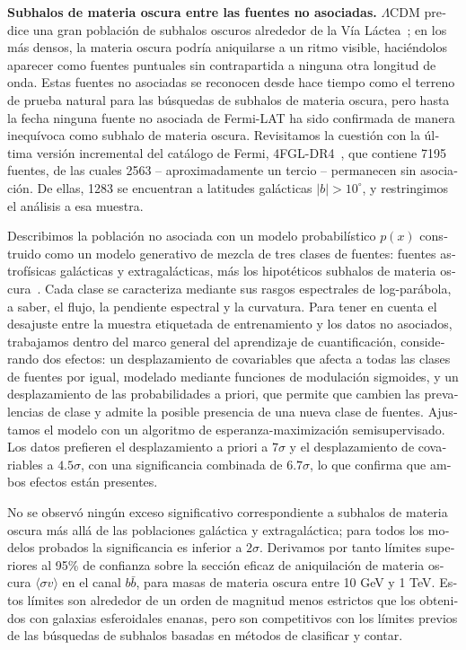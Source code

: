 \begin{otherlanguage}{spanish}
\textbf{Subhalos de materia oscura entre las fuentes no asociadas.} $\Lambda$CDM predice una gran población de subhalos oscuros alrededor de la Vía Láctea~\cite{Springel:2008cc}; en los más densos, la materia oscura podría aniquilarse a un ritmo visible, haciéndolos aparecer como fuentes puntuales sin contrapartida a ninguna otra longitud de onda. Estas fuentes no asociadas se reconocen desde hace tiempo como el terreno de prueba natural para las búsquedas de subhalos de materia oscura, pero hasta la fecha ninguna fuente no asociada de Fermi-LAT ha sido confirmada de manera inequívoca como subhalo de materia oscura. Revisitamos la cuestión con la última versión incremental del catálogo de Fermi, 4FGL-DR4~\cite{Ballet:2023qzs}, que contiene 7195 fuentes, de las cuales 2563 -- aproximadamente un tercio -- permanecen sin asociación. De ellas, 1283 se encuentran a latitudes galácticas $|b| > 10^\circ$, y restringimos el análisis a esa muestra.

Describimos la población no asociada con un modelo probabilístico $p(x)$ construido como un modelo generativo de mezcla de tres clases de fuentes: fuentes astrofísicas galácticas y extragalácticas, más los hipotéticos subhalos de materia oscura~\cite{Amerio:2025fhz}. Cada clase se caracteriza mediante sus rasgos espectrales de log-parábola, a saber, el flujo, la pendiente espectral y la curvatura. Para tener en cuenta el desajuste entre la muestra etiquetada de entrenamiento y los datos no asociados, trabajamos dentro del marco general del aprendizaje de cuantificación, considerando dos efectos: un desplazamiento de covariables que afecta a todas las clases de fuentes por igual, modelado mediante funciones de modulación sigmoides, y un desplazamiento de las probabilidades a priori, que permite que cambien las prevalencias de clase y admite la posible presencia de una nueva clase de fuentes. Ajustamos el modelo con un algoritmo de esperanza-maximización semisupervisado. Los datos prefieren el desplazamiento a priori a $7\sigma$ y el desplazamiento de covariables a $4.5\sigma$, con una significancia combinada de $6.7\sigma$, lo que confirma que ambos efectos están presentes.

No se observó ningún exceso significativo correspondiente a subhalos de materia oscura más allá de las poblaciones galáctica y extragaláctica; para todos los modelos probados la significancia es inferior a $2\sigma$. Derivamos por tanto límites superiores al 95\% de confianza sobre la sección eficaz de aniquilación de materia oscura $\langle \sigma v\rangle$ en el canal $b\bar{b}$, para masas de materia oscura entre 10 GeV y 1 TeV. Estos límites son alrededor de un orden de magnitud menos estrictos que los obtenidos con galaxias esferoidales enanas, pero son competitivos con los límites previos de las búsquedas de subhalos basadas en métodos de clasificar y contar.


\end{otherlanguage}
